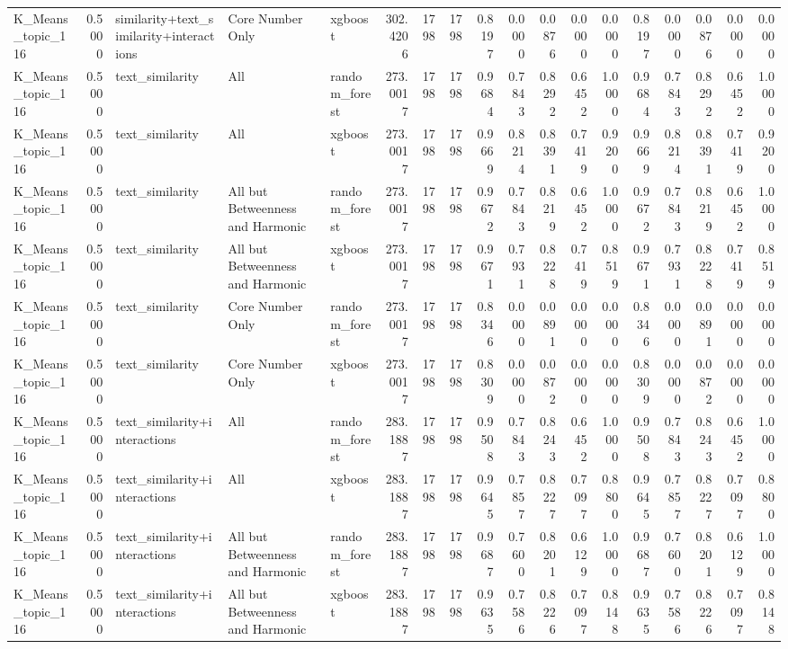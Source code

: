 \begin{tabular}{lrlllrrrrrrrrrrrrr}
K_Means_topic_116 & 0.5000 & similarity+text_similarity+interactions & Core Number Only & xgboost & 302.4206 & 1798 & 1798 & 0.8197 & 0.0000 & 0.0876 & 0.0000 & 0.0000 & 0.8197 & 0.0000 & 0.0876 & 0.0000 & 0.0000 \\
K_Means_topic_116 & 0.5000 & text_similarity & All & random_forest & 273.0017 & 1798 & 1798 & 0.9684 & 0.7843 & 0.8292 & 0.6452 & 1.0000 & 0.9684 & 0.7843 & 0.8292 & 0.6452 & 1.0000 \\
K_Means_topic_116 & 0.5000 & text_similarity & All & xgboost & 273.0017 & 1798 & 1798 & 0.9669 & 0.8214 & 0.8391 & 0.7419 & 0.9200 & 0.9669 & 0.8214 & 0.8391 & 0.7419 & 0.9200 \\
K_Means_topic_116 & 0.5000 & text_similarity & All but Betweenness and Harmonic & random_forest & 273.0017 & 1798 & 1798 & 0.9672 & 0.7843 & 0.8219 & 0.6452 & 1.0000 & 0.9672 & 0.7843 & 0.8219 & 0.6452 & 1.0000 \\
K_Means_topic_116 & 0.5000 & text_similarity & All but Betweenness and Harmonic & xgboost & 273.0017 & 1798 & 1798 & 0.9671 & 0.7931 & 0.8228 & 0.7419 & 0.8519 & 0.9671 & 0.7931 & 0.8228 & 0.7419 & 0.8519 \\
K_Means_topic_116 & 0.5000 & text_similarity & Core Number Only & random_forest & 273.0017 & 1798 & 1798 & 0.8346 & 0.0000 & 0.0891 & 0.0000 & 0.0000 & 0.8346 & 0.0000 & 0.0891 & 0.0000 & 0.0000 \\
K_Means_topic_116 & 0.5000 & text_similarity & Core Number Only & xgboost & 273.0017 & 1798 & 1798 & 0.8309 & 0.0000 & 0.0872 & 0.0000 & 0.0000 & 0.8309 & 0.0000 & 0.0872 & 0.0000 & 0.0000 \\
K_Means_topic_116 & 0.5000 & text_similarity+interactions & All & random_forest & 283.1887 & 1798 & 1798 & 0.9508 & 0.7843 & 0.8243 & 0.6452 & 1.0000 & 0.9508 & 0.7843 & 0.8243 & 0.6452 & 1.0000 \\
K_Means_topic_116 & 0.5000 & text_similarity+interactions & All & xgboost & 283.1887 & 1798 & 1798 & 0.9645 & 0.7857 & 0.8227 & 0.7097 & 0.8800 & 0.9645 & 0.7857 & 0.8227 & 0.7097 & 0.8800 \\
K_Means_topic_116 & 0.5000 & text_similarity+interactions & All but Betweenness and Harmonic & random_forest & 283.1887 & 1798 & 1798 & 0.9687 & 0.7600 & 0.8201 & 0.6129 & 1.0000 & 0.9687 & 0.7600 & 0.8201 & 0.6129 & 1.0000 \\
K_Means_topic_116 & 0.5000 & text_similarity+interactions & All but Betweenness and Harmonic & xgboost & 283.1887 & 1798 & 1798 & 0.9635 & 0.7586 & 0.8226 & 0.7097 & 0.8148 & 0.9635 & 0.7586 & 0.8226 & 0.7097 & 0.8148 \\

\end{tabular}
